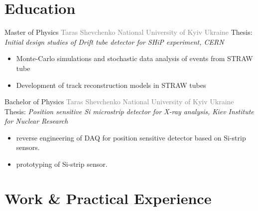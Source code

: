 \documentclass[11pt,a4paper,sans]{moderncv} %
\begin{document}
\makecvtitle %



\section{Education}

	{Master of Physics}
	{\textcolor{gray}{Taras Shevchenko National University of Kyiv}}
	{\textcolor{gray}{Ukraine}}
	{\newline{} Thesis: \emph{Initial design studies of Drift tube detector for SHiP experiment, CERN}}
	{
	\begin{itemize}
		\item Monte-Carlo simulations and stochastic data analysis of events from STRAW tube
		\item Development of track reconstruction models in STRAW tubes
	\end{itemize}
	}


	{Bachelor of Physics}
	{\textcolor{gray}{Taras Shevchenko National University of Kyiv}}
	{\textcolor{gray}{Ukraine}}
{
	\newline{}
	Thesis: \emph{Position sensitive Si microstrip detector for X-ray analysis, Kiev Institute for Nuclear Research}
}
{
	\begin{itemize}
		\item reverse engineering of DAQ for position sensitive detector based on Si-strip sensors.
		\item prototyping of Si-strip sensor.
	\end{itemize} 
}


\section{Work \& Practical Experience}

\end{document}
